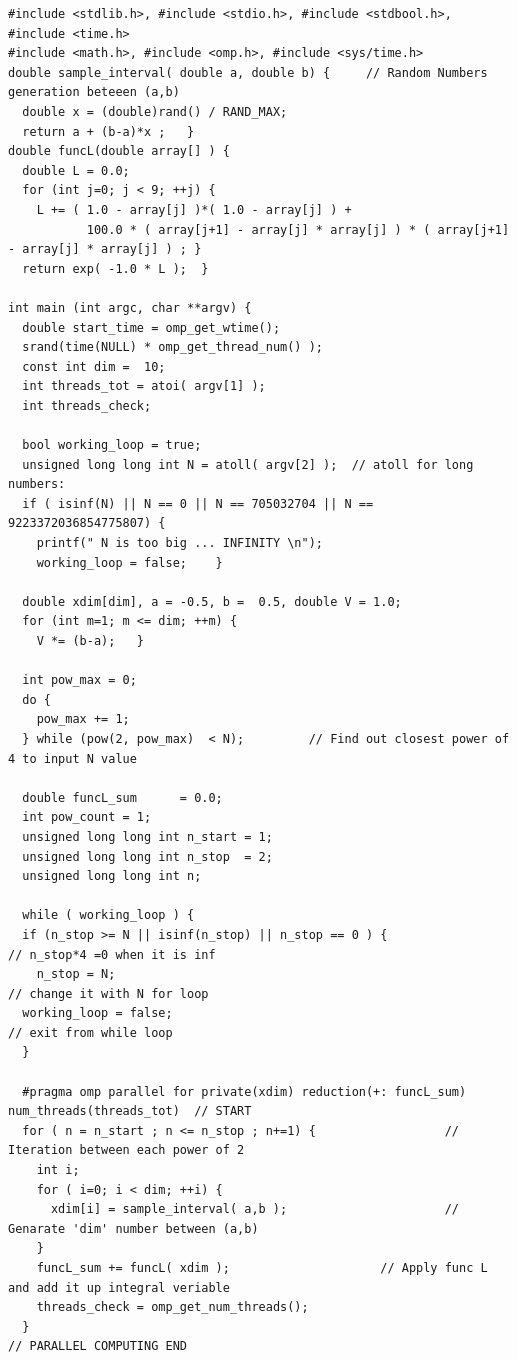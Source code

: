 \documentclass{article}
\begin{document}
\begin{program}
	\begin{verbatim}
#include <stdlib.h>, #include <stdio.h>, #include <stdbool.h>, #include <time.h>
#include <math.h>, #include <omp.h>, #include <sys/time.h>
double sample_interval( double a, double b) {     // Random Numbers generation beteeen (a,b)
  double x = (double)rand() / RAND_MAX;
  return a + (b-a)*x ;   }
double funcL(double array[] ) {
  double L = 0.0;
  for (int j=0; j < 9; ++j) {
    L += ( 1.0 - array[j] )*( 1.0 - array[j] ) + 
           100.0 * ( array[j+1] - array[j] * array[j] ) * ( array[j+1] - array[j] * array[j] ) ; }
  return exp( -1.0 * L );  }

int main (int argc, char **argv) {
  double start_time = omp_get_wtime();
  srand(time(NULL) * omp_get_thread_num() );
  const int dim =  10;
  int threads_tot = atoi( argv[1] );
  int threads_check;

  bool working_loop = true;
  unsigned long long int N = atoll( argv[2] );  // atoll for long numbers:
  if ( isinf(N) || N == 0 || N == 705032704 || N == 9223372036854775807) {   
    printf(" N is too big ... INFINITY \n");
    working_loop = false;    }                                 

  double xdim[dim], a = -0.5, b =  0.5, double V = 1.0;                         
  for (int m=1; m <= dim; ++m) {
    V *= (b-a);   }

  int pow_max = 0;
  do {
    pow_max += 1;
  } while (pow(2, pow_max)  < N);         // Find out closest power of 4 to input N value

  double funcL_sum      = 0.0;
  int pow_count = 1;
  unsigned long long int n_start = 1;
  unsigned long long int n_stop  = 2;
  unsigned long long int n;

  while ( working_loop ) {
  if (n_stop >= N || isinf(n_stop) || n_stop == 0 ) {                // n_stop*4 =0 when it is inf
    n_stop = N;                                                       // change it with N for loop
  working_loop = false;                                                    // exit from while loop 
  }

  #pragma omp parallel for private(xdim) reduction(+: funcL_sum) num_threads(threads_tot)  // START
  for ( n = n_start ; n <= n_stop ; n+=1) {                  // Iteration between each power of 2 
    int i;
    for ( i=0; i < dim; ++i) {
      xdim[i] = sample_interval( a,b );                      // Genarate 'dim' number between (a,b)
    }
    funcL_sum += funcL( xdim );                     // Apply func L and add it up integral veriable
    threads_check = omp_get_num_threads();
  }                                                                      // PARALLEL COMPUTING END


\end{verbatim}
\end{program}
\end{document}

